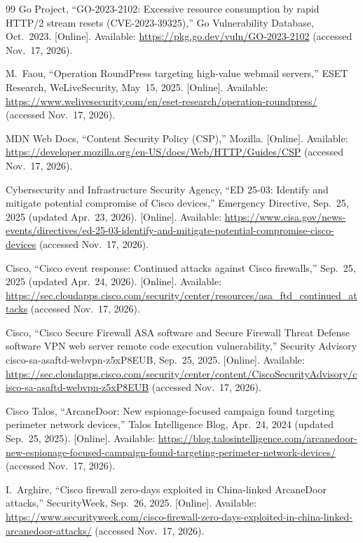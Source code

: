 \documentclass[11pt,a4paper]{article}
\begin{document}
\begin{thebibliography}{99}
Go Project, ``GO-2023-2102: Excessive resource consumption by rapid HTTP/2 stream resets (CVE-2023-39325),'' Go Vulnerability Database, Oct.~2023. [Online]. Available:
\url{https://pkg.go.dev/vuln/GO-2023-2102} (accessed Nov.~17, 2026).

M.~Faou, ``Operation RoundPress targeting high-value webmail servers,'' ESET Research, WeLiveSecurity, May~15, 2025. [Online]. Available:
\url{https://www.welivesecurity.com/en/eset-research/operation-roundpress/} (accessed Nov.~17, 2026).

MDN Web Docs, ``Content Security Policy (CSP),'' Mozilla. [Online]. Available:
\url{https://developer.mozilla.org/en-US/docs/Web/HTTP/Guides/CSP} (accessed Nov.~17, 2026).

Cybersecurity and Infrastructure Security Agency, ``ED 25-03: Identify and mitigate potential compromise of Cisco devices,'' Emergency Directive, Sep.~25, 2025 (updated Apr.~23, 2026). [Online]. Available:
\url{https://www.cisa.gov/news-events/directives/ed-25-03-identify-and-mitigate-potential-compromise-cisco-devices} (accessed Nov.~17, 2026).

Cisco, ``Cisco event response: Continued attacks against Cisco firewalls,'' Sep.~25, 2025 (updated Apr.~24, 2026). [Online]. Available:
\url{https://sec.cloudapps.cisco.com/security/center/resources/asa_ftd_continued_attacks} (accessed Nov.~17, 2026).

Cisco, ``Cisco Secure Firewall ASA software and Secure Firewall Threat Defense software VPN web server remote code execution vulnerability,'' Security Advisory cisco-sa-asaftd-webvpn-z5xP8EUB, Sep.~25, 2025. [Online]. Available:
\url{https://sec.cloudapps.cisco.com/security/center/content/CiscoSecurityAdvisory/cisco-sa-asaftd-webvpn-z5xP8EUB} (accessed Nov.~17, 2026).

Cisco Talos, ``ArcaneDoor: New espionage-focused campaign found targeting perimeter network devices,'' Talos Intelligence Blog, Apr.~24, 2024 (updated Sep.~25, 2025). [Online]. Available:
\url{https://blog.talosintelligence.com/arcanedoor-new-espionage-focused-campaign-found-targeting-perimeter-network-devices/} (accessed Nov.~17, 2026).

I.~Arghire, ``Cisco firewall zero-days exploited in China-linked ArcaneDoor attacks,'' SecurityWeek, Sep.~26, 2025. [Online]. Available:
\url{https://www.securityweek.com/cisco-firewall-zero-days-exploited-in-china-linked-arcanedoor-attacks/} (accessed Nov.~17, 2026).


\end{thebibliography}
\end{document}
